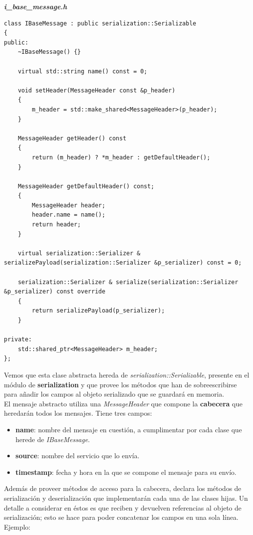 \textbf{\textit{i\_base\_message.h} \cite{i-base-message}}
\begin{lstlisting}
class IBaseMessage : public serialization::Serializable
{
public:
	~IBaseMessage() {}

	virtual std::string name() const = 0;

	void setHeader(MessageHeader const &p_header)
	{
		m_header = std::make_shared<MessageHeader>(p_header);
	}

	MessageHeader getHeader() const
	{
		return (m_header) ? *m_header : getDefaultHeader();
	}

	MessageHeader getDefaultHeader() const;
	{
		MessageHeader header;
		header.name = name();
		return header;
	}

	virtual serialization::Serializer & serializePayload(serialization::Serializer &p_serializer) const = 0;

	serialization::Serializer & serialize(serialization::Serializer &p_serializer) const override
	{
		return serializePayload(p_serializer);
	}
	
private:
	std::shared_ptr<MessageHeader> m_header;
};
\end{lstlisting}

Vemos que esta clase abstracta hereda de \emph{serialization::Serializable}, presente en el módulo de \textbf{serialization} y que provee los métodos que han de sobreescribirse para añadir los campos al objeto serializado que se guardará en memoria.\\

El mensaje abstracto utiliza una \textit{MessageHeader} que compone la \textbf{cabecera} que heredarán todos los mensajes. Tiene tres campos:

\begin{itemize}
	\item \textbf{name}: nombre del mensaje en cuestión, a cumplimentar por cada clase que herede de \textit{IBaseMessage}.
	\item \textbf{source}: nombre del servicio que lo envía.
	\item \textbf{timestamp}: fecha y hora en la que se compone el mensaje para su envío.
\end{itemize}

Además de proveer métodos de acceso para la cabecera, declara los métodos de serialización y deserialización que implementarán cada una de las clases hijas. Un detalle a considerar en éstos es que reciben y devuelven referencias al objeto de serialización; esto se hace para poder concatenar los campos en una sola línea. Ejemplo:

